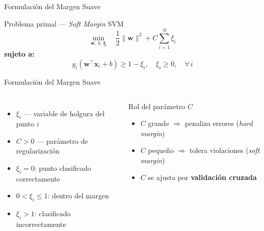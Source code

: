 \documentclass[aspectratio=169,xcolor=dvipsnames]{beamer}
\begin{document}
\begin{frame}{Formulación del Margen Suave}
    \begin{block}{Problema primal — \textit{Soft Margin} SVM}
        \begin{equation}
            \min_{\mathbf{w},\,b,\,\boldsymbol{\xi}} \quad \frac{1}{2}\|\mathbf{w}\|^2 + C \sum_{i=1}^{N} \xi_i
        \end{equation}
        \textbf{sujeto a:}
        \begin{equation}
            y_i(\mathbf{w}^\top \mathbf{x}_i + b) \geq 1 - \xi_i, \quad \xi_i \geq 0, \quad \forall \, i
        \end{equation}
    \end{block}
\end{frame}
\begin{frame}{Formulación del Margen Suave}

    \begin{columns}
        \begin{itemize}
            \item $\xi_i$ — variable de holgura del punto $i$
            \item $C > 0$ — parámetro de regularización
            \item $\xi_i = 0$: punto clasificado correctamente
            \item $0 < \xi_i \leq 1$: dentro del margen
            \item $\xi_i > 1$: clasificado incorrectamente
        \end{itemize}

        \begin{alertblock}{Rol del parámetro $C$}
            \begin{itemize}
                \item $C$ grande $\Rightarrow$ penaliza errores (\textit{hard margin})
                \item $C$ pequeño $\Rightarrow$ tolera violaciones (\textit{soft margin})
                \item $C$ se ajusta por \textbf{validación cruzada}
            \end{itemize}
        \end{alertblock}
    \end{columns}
\end{frame}
\end{document}
